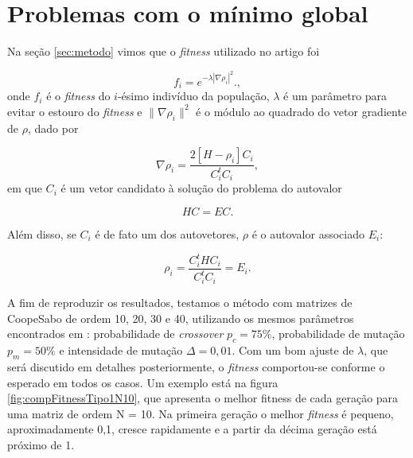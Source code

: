 \section{Problemas com o mínimo global}	
	
	Na seção \ref{sec:metodo} vimos que o \textit{fitness} utilizado no artigo \cite{metodo2004}  foi
	
	\begin{equation}
		\label{eq:fitnessGrad2}
		f_i = e^{-\lambda |\nabla \rho_i|^2}.,
	\end{equation}
	onde $f_i$ é o \textit{fitness} do $i$-ésimo indivíduo da população, $\lambda$ é um parâmetro para evitar o estouro do \textit{fitness} e $\| \nabla \rho_i\|^2$ é o módulo ao quadrado do vetor gradiente de $\rho$, dado por
		
				\begin{equation}
					\nabla \rho_i = \frac{2[H - \rho_i]C_i}{C_i^t C_i},
				\end{equation}
	em que $C_i$ é um vetor candidato à solução do problema do autovalor
	
	\begin{equation}
		HC = EC.
	\end{equation}
	
	Além disso, se $C_i$ é de fato um dos autovetores, $\rho$ é o autovalor associado $E_i$:
	
	\begin{equation}\label{eq:rho_eh_E}
		\rho_i = \frac{C_i^t H C_i}{C_i^t C_i} = E_i.
	\end{equation}
	
	A fim de reproduzir os resultados, testamos o método com matrizes de Coope\-Sabo de ordem 10, 20, 30 e 40, utilizando os mesmos parâmetros encontrados em \cite{metodo2004}: probabilidade de \textit{crossover} $p_c = 75\%$, probabilidade de mutação $p_m = 50\%$ e intensidade de mutação $\Delta = 0,01$. Com um bom ajuste de $\lambda$, que será discutido em detalhes posteriormente, o \textit{fitness} comportou-se conforme o esperado em todos os casos. Um exemplo está na figura \ref{fig:compFitnessTipo1N10}, que apresenta o melhor fitness de cada geração para uma matriz de ordem N = 10. Na primeira geração o melhor \textit{fitness} é pequeno, aproximadamente 0,1, cresce rapidamente e a partir da décima geração está próximo de 1.
	
